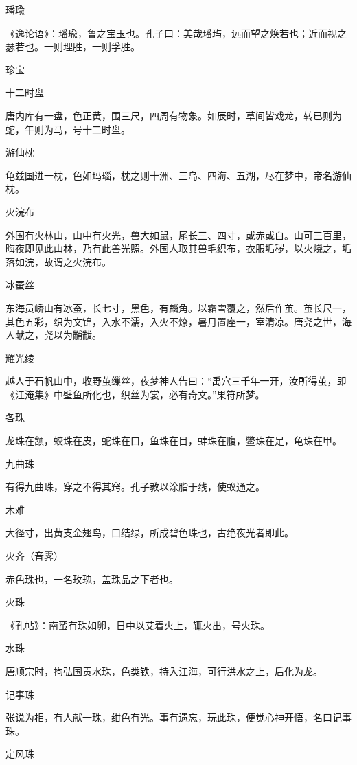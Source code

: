 \documentclass[a4paper,12pt,UTF8,twoside]{ctexbook}
\begin{document}
    璠瑜
    
    《逸论语》：璠瑜，鲁之宝玉也。孔子曰：美哉璠玙，远而望之焕若也；近而视之瑟若也。一则理胜，一则孚胜。
    
    珍宝
    
    十二时盘
    
    唐内库有一盘，色正黄，围三尺，四周有物象。如辰时，草间皆戏龙，转已则为蛇，午则为马，号十二时盘。
    
    游仙枕
    
    龟兹国进一枕，色如玛瑙，枕之则十洲、三岛、四海、五湖，尽在梦中，帝名游仙枕。
    
    火浣布
    
    外国有火林山，山中有火光，兽大如鼠，尾长三、四寸，或赤或白。山可三百里，晦夜即见此山林，乃有此兽光照。外国人取其兽毛织布，衣服垢秽，以火烧之，垢落如浣，故谓之火浣布。
    
    冰蚕丝
    
    东海员峤山有冰蚕，长七寸，黑色，有麟角。以霜雪覆之，然后作茧。茧长尺一，其色五彩，织为文锦，入水不濡，入火不燎，暑月置座一，室清凉。唐尧之世，海人献之，尧以为黼黻。
    
    耀光绫
    
    越人于石帆山中，收野茧缫丝，夜梦神人告曰：“禹穴三千年一开，汝所得茧，即《江淹集》中壁鱼所化也，织丝为裳，必有奇文。”果符所梦。
    
    各珠
    
    龙珠在颔，蛟珠在皮，蛇珠在口，鱼珠在目，蚌珠在腹，鳖珠在足，龟珠在甲。
    
    九曲珠
    
    有得九曲珠，穿之不得其窍。孔子教以涂脂于线，使蚁通之。
    
    木难
    
    大径寸，出黄支金翅鸟，口结绿，所成碧色珠也，古绝夜光者即此。
    
    火齐（音霁）
    
    赤色珠也，一名玫瑰，盖珠品之下者也。
    
    火珠
    
    《孔帖》：南蛮有珠如卵，日中以艾着火上，辄火出，号火珠。
    
    水珠
    
    唐顺宗时，拘弘国贡水珠，色类铁，持入江海，可行洪水之上，后化为龙。
    
    记事珠
    
    张说为相，有人献一珠，绀色有光。事有遗忘，玩此珠，便觉心神开悟，名曰记事珠。
    
    定风珠
    
\end{document}

